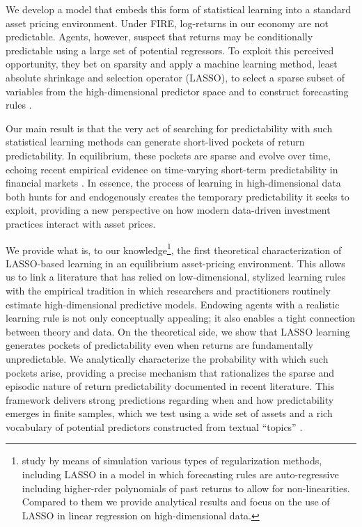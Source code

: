 \documentclass[11pt]{article}
\begin{document}
We develop a model that embeds this form of statistical learning into a standard asset pricing environment. 
Under FIRE, log-returns in our economy are not predictable. 
Agents, however, suspect that returns may be conditionally predictable using a large set of potential regressors. 
To exploit this perceived opportunity, they bet on sparsity and apply a machine learning method, least absolute shrinkage and selection operator (LASSO), to select a sparse subset of variables from the high-dimensional predictor space and to construct forecasting rules \citep{Tibshirani1996}.

Our main result is that the very act of searching for predictability with such statistical learning methods can generate short-lived pockets of return predictability. 
In equilibrium, these pockets are sparse and evolve over time, echoing recent empirical evidence on time-varying short-term predictability in financial markets \citep{Chinco2019,Farmer2023}. 
In essence, the process of learning in high-dimensional data both hunts for and endogenously creates the temporary predictability it seeks to exploit, providing a new perspective on how modern data-driven investment practices interact with asset prices.

We provide what is, to our knowledge\footnote{\cite{Georges2021} study by means of simulation various types of regularization methods, including LASSO
in a model in which forecasting rules are auto-regressive including higher-rder polynomials of past returns to allow for non-linearities.
Compared to them we provide analytical results and focus on the use of LASSO in linear regression on high-dimensional data.}, the first theoretical characterization of LASSO-based learning in an equilibrium asset-pricing environment. 
This allows us to link a literature that has relied on low-dimensional, stylized learning rules with the empirical tradition in which researchers and practitioners routinely estimate high-dimensional predictive models.
Endowing agents with a realistic learning rule is not only conceptually appealing; it also enables a tight connection between theory and data. 
On the theoretical side, we show that LASSO learning generates pockets of predictability even when returns are fundamentally unpredictable. 
We analytically characterize the probability with which such pockets arise, providing a precise mechanism that rationalizes the sparse and episodic nature of return predictability documented in recent literature. 
This framework delivers strong predictions regarding when and how predictability emerges in finite samples, which we test using a wide set of assets and a rich vocabulary of potential predictors constructed from textual “topics” \citep{Bybee2021}.
\end{document}
